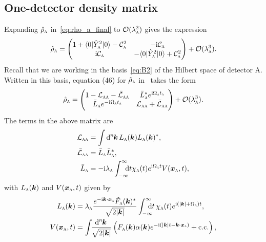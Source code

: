 \documentclass[pra,nofootinbib,floats,aps,twocolumn,tightenlines,superscriptaddress]{revtex4-1}
\renewcommand*\d[2][]{%
	\mathrm{d}%
	\ifx\relax#1\relax\else
	\rule{-0.02em}{1.5ex}^{#1}\rule{0.08em}{0ex}\!
	\fi
	#2\,
}
\newcommand{\ket}[1]{| {#1} \rangle}
\newcommand{\bra}[1]{\langle {#1} |}
\newcommand{\ii}{\mathrm{i}}
\newcommand{\rhoa}{\hat{\rho}_\textsc{a}}
\newcommand{\Ya}{\hat{Y}_\textsc{a}}
\newcommand{\ca}{\mathcal{C}_\textsc{a}}
\begin{document}
\subsection{One-detector density matrix}
\label{Appendix:pert1}


Expanding $\rhoa$ in~\eqref{eq:rho_a_final} to $\mathcal{O}(\lambda_\textsc{a}^2)$ gives the expression
\begin{equation}
    \label{eq:rho_a_pert1}
    \rhoa=
    \begin{pmatrix}
    1+\bra{0}\Ya^2\ket{0}-\ca^2 &
    -\ii\ca \\
    \ii\ca & -\bra{0}\Ya^2\ket{0}+\ca^2
    \end{pmatrix}
    +\mathcal{O}(\lambda_\textsc{a}^3).
\end{equation}
Recall that we are working in the basis~\eqref{eq:B2} of the Hilbert space of detector A. Written in this basis, equation (46) for $\rhoa$ in~\cite{Simidzija2017b} takes the form
\begin{equation}
\label{eq:rho_a_pert2}
	\hat{\rho}_\textsc{a}=
	\begin{pmatrix}
	1-\mathcal{L}_{\textsc{aa}}-
	\bar{\mathcal{L}}_{\textsc{aa}} & \bar{L}_\textsc{a}^* e^{\ii\Omega_\textsc{a}t_\textsc{a}}\\
	\bar{L}_\textsc{a} e^{-\ii\Omega_\textsc{a}t_\textsc{a}} & \mathcal{L}_{\textsc{aa}}+
	\bar{\mathcal{L}}_{\textsc{aa}}
	\end{pmatrix}
	+\mathcal{O}(\lambda_\textsc{a}^3).
\end{equation}
The terms in the above matrix are
\begin{align}
\label{eq:Laa}
    \mathcal{L}_{\textsc{aa}}
	&=
    \int\d[n]{\bm{k}}
    L_\textsc{a}(\bm{k})
    L_\textsc{a}(\bm{k})^*,
    \\
    \bar{\mathcal{L}}_{\textsc{aa}}
	&=
	\bar{L}_\textsc{a}\bar{L}_\textsc{a}^*,
	\\
	\bar{L}_\textsc{a}
	&=
	-\ii\lambda_\textsc{a}
	\int_{-\infty}^{\infty}\!\!\!\!\dif t			\chi_\textsc{a}(t)e^{\ii\Omega_\textsc{a} t}V(\bm{x}_\textsc{a},t),
\end{align}
with $L_\textsc{a}(\bm k)$ and $V(\bm{x}_\textsc{a}, t)$ given by
\begin{align}
    L_\textsc{a}(\bm{k})
	&=
	\lambda_\textsc{a}
	\frac{e^{-\ii\bm{k}\cdot\bm{x}_\textsc{a}}
	\tilde{F}_\textsc{a}(\bm{k})^*}{\sqrt{2|\bm{k}|}}
	\int_{-\infty}^{\infty}\!\!\!\!\!\dif t \,\chi_\textsc{a}(t)
	e^{\ii(|\bm{k}|+\Omega_\textsc{a})t},
	\\
	V(\bm{x}_\textsc{a},t)
	&=
	\int\!\!
	\frac{\d[n]{\bm{k}}}{\sqrt{2|\bm k|}}
	\left(
	F_\textsc{a}(\bm k)
	\alpha(\bm k)
	e^{-\ii(|\bm k|t-\bm k\cdot \bm x_\textsc{a})}
	+\text{c.c.}
	\right),
\end{align}
\end{document}
